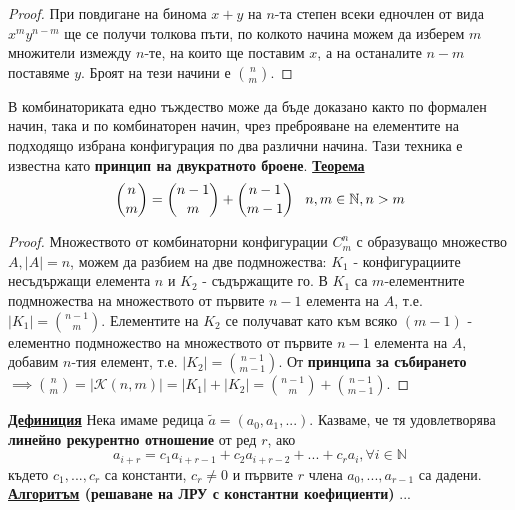 \documentclass{article}
\begin{document}
\begin{proof}
При повдигане на бинома $x + y$ на $n$-та степен всеки едночлен от вида $x^my^{n - m}$ ще се получи толкова пъти, по колкото начина
можем да изберем $m$ множители измежду $n$-те, на които ще поставим $x$, а на останалите $n - m$ поставяме $y$. Броят на тези начини е $\binom{n}{m}$.
\end{proof}
В комбинаториката едно тъждество може да бъде доказано както по формален начин, така и по комбинаторен начин, чрез преброяване на
елементите на подходящо избрана конфигурация по два различни начина. Тази техника е известна като \textbf{принцип на двукратното
броене}. \newline\newline
\textbf{\underline{Теорема}}
$$\binom{n}{m} = \binom{n - 1}{m} + \binom{n - 1}{m - 1} \hspace{0.3cm} n, m \in \mathbb{N}, n > m$$
\begin{proof}
Множеството от комбинаторни конфигурации $C^n_m$ с образуващо множество $A, |A| = n$, можем да разбием на две подмножества: $K_1$ - конфигурациите
несъдържащи елемента $n$ и $K_2$ - съдържащите го. В $K_1$ са $m$-елементните подмножества на множеството от
първите $n - 1$ елемента на $A$, т.е. $|K_1| = \binom{n - 1}{m}$. Елементите на $K_2$ се получават като към всяко
$(m - 1)$ - елементно подмножество на множеството от първите $n - 1$ елемента на $A$, добавим $n$-тия елемент, т.е. $|K_2| = \binom{n - 1}{m - 1}$.
От \textbf{принципа за събирането} $\implies \binom{n}{m} = |\mathcal{K}(n, m)| = |K_1| + |K_2| = \binom{n - 1}{m} + \binom{n - 1}{m - 1}$.
\end{proof}
\textbf{\underline{Дефиниция}}
Нека имаме редица $\tilde{a} = (a_0, a_1, ...)$. Казваме, че тя удовлетворява \textbf{линейно рекурентно отношение} от ред $r$, ако
$$a_{i+r} = c_1a_{i+r-1} + c_2a_{i+r-2} + ... + c_ra_i, \forall i \in \mathbb{N}$$
където $c_1, ..., c_r$ са константи, $c_r \neq 0$ и първите $r$ члена $a_0, ..., a_{r-1}$ са дадени. \newline\newline
\textbf{\underline{Алгоритъм} (решаване на ЛРУ с константни коефициенти)} \newline\newline
...
\subsection*{\color{lightBlue}{3. Графи. Дървета. Обхождания на графи.}}
\end{document}
